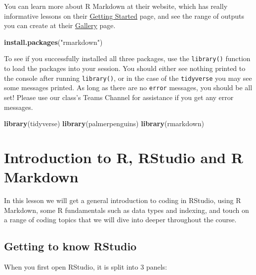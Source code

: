 \documentclass[
]{book}
\newenvironment{Shaded}{\begin{snugshade}}{\end{snugshade}}
\newcommand{\FunctionTok}[1]{\textcolor[rgb]{0.13,0.29,0.53}{\textbf{#1}}}
\newcommand{\NormalTok}[1]{#1}
\newcommand{\StringTok}[1]{\textcolor[rgb]{0.31,0.60,0.02}{#1}}
\begin{document}
You can learn more about R Markdown at their website, which has really informative lessons on their \href{https://rmarkdown.rstudio.com/lesson-1.html}{Getting Started} page, and see the range of outputs you can create at their \href{https://rmarkdown.rstudio.com/gallery.html}{Gallery} page.

\begin{Shaded}
\begin{Highlighting}[]
\FunctionTok{install.packages}\NormalTok{(}\StringTok{"rmarkdown"}\NormalTok{)}
\end{Highlighting}
\end{Shaded}

To see if you successfully installed all three packages, use the \texttt{library()} function to load the packages into your session. You should either see nothing printed to the console after running \texttt{library()}, or in the case of the \texttt{tidyverse} you may see some messages printed. As long as there are no \texttt{error} messages, you should be all set! Please use our class's Teams Channel for assistance if you get any error messages.

\begin{Shaded}
\begin{Highlighting}[]
\FunctionTok{library}\NormalTok{(tidyverse)}
\FunctionTok{library}\NormalTok{(palmerpenguins)}
\FunctionTok{library}\NormalTok{(rmarkdown)}
\end{Highlighting}
\end{Shaded}

\hypertarget{introduction-to-r-rstudio-and-r-markdown}{%
\chapter{Introduction to R, RStudio and R Markdown}\label{introduction-to-r-rstudio-and-r-markdown}}

In this lesson we will get a general introduction to coding in RStudio, using R Markdown, some R fundamentals such as data types and indexing, and touch on a range of coding topics that we will dive into deeper throughout the course.

\hypertarget{getting-to-know-rstudio}{%
\section{Getting to know RStudio}\label{getting-to-know-rstudio}}

When you first open RStudio, it is split into 3 panels:
\end{document}
